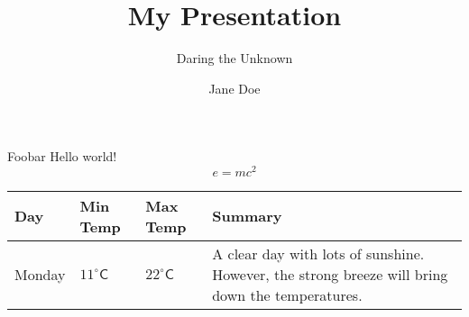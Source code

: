 \documentclass{beamer}
\begin{document}
  \title{My Presentation}
  \subtitle{Daring the Unknown}
  \author{Jane Doe}
  \frame{\maketitle}

  \begin{frame}{Foo}{bar}
    Hello world!
    \begin{equation}
      \tag{Mass--energy equivalence} e=mc^2
    \end{equation}
    \begin{center}
      \begin{tabularx}{\textwidth}{lllX}
      \toprule
      Day & Min Temp & Max Temp & Summary \\
      \midrule
      Monday & $11^{\circ}\mathsf{C}$ & $22^\circ\mathsf{C}$ & A
      clear day with lots of sunshine. However, the strong breeze
      will bring down the temperatures. \\
      \bottomrule
      \end{tabularx}
    \end{center}
  \end{frame}
\end{document}
